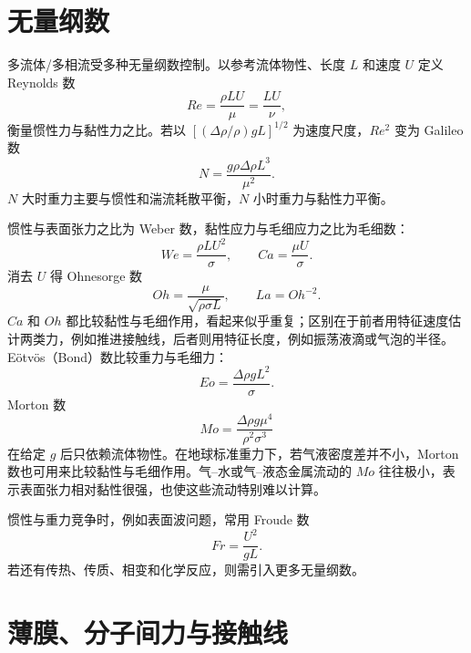 \documentclass[11pt,a4paper,openany,fontset=none]{ctexbook}
\begin{document}
\section{无量纲数}


多流体/多相流受多种无量纲数控制。以参考流体物性、长度 $L$ 和速度 $U$ 定义 Reynolds 数
\begin{equation}
 Re=\frac{\rho LU}{\mu}=\frac{LU}{\nu}, \tag{2.64}
\end{equation}
衡量惯性力与黏性力之比。若以 $[(\Delta\rho/\rho)gL]^{1/2}$ 为速度尺度，$Re^2$ 变为 Galileo 数
\begin{equation}
 N=\frac{g\rho\Delta\rho L^3}{\mu^2}. \tag{2.65}
\end{equation}
$N$ 大时重力主要与惯性和湍流耗散平衡，$N$ 小时重力与黏性力平衡。

惯性与表面张力之比为 Weber 数，黏性应力与毛细应力之比为毛细数：
\begin{equation}
 We=\frac{\rho LU^2}{\sigma},\qquad Ca=\frac{\mu U}{\sigma}. \tag{2.66--2.67}
\end{equation}
消去 $U$ 得 Ohnesorge 数
\begin{equation}
 Oh=\frac{\mu}{\sqrt{\rho\sigma L}},\qquad La=Oh^{-2}. \tag{2.68}
\end{equation}
$Ca$ 和 $Oh$ 都比较黏性与毛细作用，看起来似乎重复；区别在于前者用特征速度估计两类力，例如推进接触线，后者则用特征长度，例如振荡液滴或气泡的半径。E\"otv\"os（Bond）数比较重力与毛细力：
\begin{equation}
 Eo=\frac{\Delta\rho gL^2}{\sigma}. \tag{2.69}
\end{equation}
Morton 数
\begin{equation}
 Mo=\frac{\Delta\rho g\mu^4}{\rho^2\sigma^3} \tag{2.70}
\end{equation}
在给定 $g$ 后只依赖流体物性。在地球标准重力下，若气液密度差并不小，Morton 数也可用来比较黏性与毛细作用。气--水或气--液态金属流动的 $Mo$ 往往极小，表示表面张力相对黏性很强，也使这些流动特别难以计算。

惯性与重力竞争时，例如表面波问题，常用 Froude 数
\begin{equation}
 Fr=\frac{U^2}{gL}. \tag{2.71}
\end{equation}
若还有传热、传质、相变和化学反应，则需引入更多无量纲数。

\section{薄膜、分子间力与接触线}
\end{document}
